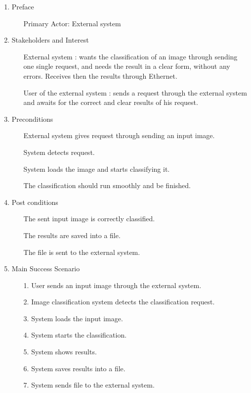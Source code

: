 \documentclass[parskip=full]{scrartcl}
\begin{document}
\begin{enumerate}
	\item Preface
	\begin{itemize} [nosep]
		\item[] Primary Actor: External system
	\end{itemize}
	\item Stakeholders and Interest
	\begin{itemize} [nosep]
		\item[] External system : wants the classification of an image through sending one single request, and needs the result in a clear form, without any errors. Receives then the results through Ethernet. 
		\item[] User of the external system : sends a request through the external system and awaits for the correct and clear results of his request.
	\end{itemize}
	\item Preconditions
	\begin{itemize} [nosep]
		\item[] External system gives request through sending an input image.
		\item[] System detects request.
		\item[] System loads the image and starts classifying it.
		\item[] The classification should run smoothly and be finished.
	\end{itemize}
	\item Post conditions
	\begin{itemize} [nosep]
		\item[] The sent input image is correctly classified. 
		\item[] The results are saved into a file. 
		\item[] The file is sent to the external system.
	\end{itemize}
	\item Main Success Scenario
	\begin{itemize} [nosep]
		\item[1.] User sends an input image through the external system.
		\item[2.] Image classification system detects the classification request.
		\item[3.] System loads the input image.
		\item[4.] System starts the classification.
		\item[5.] System shows results.
		\item[6.] System saves results into a file.
		\item[7.] System sends file to the external system.
	\end{itemize}


\end{enumerate}
\end{document}

